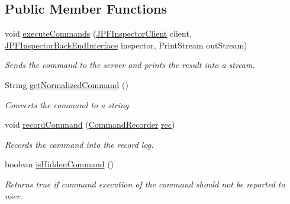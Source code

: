 \subsection*{Public Member Functions}
\begin{DoxyCompactItemize}
\item 
void \hyperlink{classgov_1_1nasa_1_1jpf_1_1inspector_1_1client_1_1commands_1_1_cmd_record_clear_a62a67f27d7b740c9065a2d870bbde7e4}{execute\+Commands} (\hyperlink{classgov_1_1nasa_1_1jpf_1_1inspector_1_1client_1_1_j_p_f_inspector_client}{J\+P\+F\+Inspector\+Client} client, \hyperlink{interfacegov_1_1nasa_1_1jpf_1_1inspector_1_1interfaces_1_1_j_p_f_inspector_back_end_interface}{J\+P\+F\+Inspector\+Back\+End\+Interface} inspector, Print\+Stream out\+Stream)
\begin{DoxyCompactList}\small\item\em Sends the command to the server and prints the result into a stream. \end{DoxyCompactList}\item 
String \hyperlink{classgov_1_1nasa_1_1jpf_1_1inspector_1_1client_1_1commands_1_1_cmd_record_clear_a63993f923b11283885153959d0f7653f}{get\+Normalized\+Command} ()
\begin{DoxyCompactList}\small\item\em Converts the command to a string. \end{DoxyCompactList}\item 
void \hyperlink{classgov_1_1nasa_1_1jpf_1_1inspector_1_1client_1_1_client_command_ae0670332ec750bc5b9016d0b04d8adfe}{record\+Command} (\hyperlink{classgov_1_1nasa_1_1jpf_1_1inspector_1_1client_1_1_command_recorder}{Command\+Recorder} \hyperlink{classgov_1_1nasa_1_1jpf_1_1inspector_1_1client_1_1_client_command_af4246f2427035c72a6af45a2c61361f7}{rec})
\begin{DoxyCompactList}\small\item\em Records the command into the record log. \end{DoxyCompactList}\item 
boolean \hyperlink{classgov_1_1nasa_1_1jpf_1_1inspector_1_1client_1_1_client_command_afb09c400c64e2d8e01059b91ff847761}{is\+Hidden\+Command} ()
\begin{DoxyCompactList}\small\item\em Returns true if command execution of the command should not be reported to user. \end{DoxyCompactList}\end{DoxyCompactItemize}
